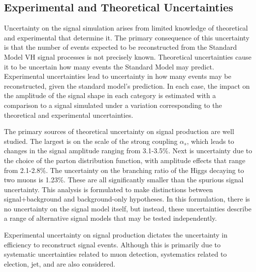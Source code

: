 \subsection{Experimental and Theoretical Uncertainties}

Uncertainty on the signal simulation arises from limited knowledge of theoretical and experimental that determine it. 
The primary consequence of this uncertainty is that the number of events expected to be reconstructed from the Standard Model VH signal processes is not precisely known.
Theoretical uncertainties cause it to be uncertain how many events the Standard Model may predict.
Experimental uncertainties lead to uncertainty in how many events may be reconstructed, given the standard model's prediction.
In each case, the impact on the amplitude of the signal shape in each category is estimated with a comparison to a signal simulated under a variation corresponding to the theoretical and experimental uncertainties.

The primary sources of theoretical uncertainty on signal production are well studied. \cite{CERNYellowReport4}
The largest is on the scale of the strong coupling $\alpha_s$, which leads to changes in the signal amplitude ranging from 3.1-3.5\%.
Next is uncertainty due to the choice of the parton distribution function, with amplitude effects that range from 2.1-2.8\%.
The uncertainty on the branching ratio of the Higgs decaying to two muons is 1.23\%. \cite{CERNYellowReport4}
These are all significantly smaller than the spurious signal uncertainty.
This analysis is formulated to make distinctions between signal+background and background-only hypotheses.
In this formulation, there is no uncertainty on the signal model itself, but instead, these uncertainties describe a range of alternative signal models that may be tested independently.

Experimental uncertainty on signal production dictates the uncertainty in efficiency to reconstruct signal events. 
Although this is primarily due to systematic uncertainties related to muon detection, systematics related to election, jet, and \met are also considered.

